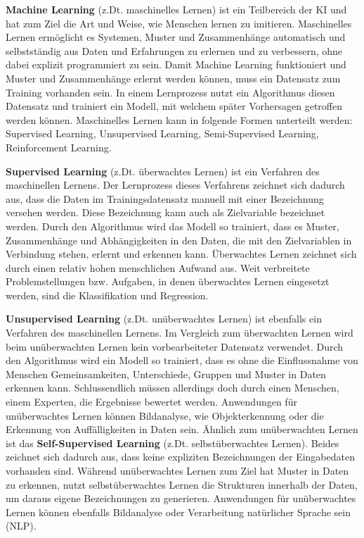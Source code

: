 \textbf{Machine Learning} (z.Dt. maschinelles Lernen) ist ein Teilbereich der KI und hat zum Ziel die Art und Weise, wie Menschen lernen zu imitieren.
Maschinelles Lernen ermöglicht es Systemen, Muster und Zusammenhänge automatisch und selbstständig aus Daten und Erfahrungen zu erlernen und zu verbessern, ohne dabei explizit programmiert zu sein.
Damit Machine Learning funktioniert und Muster und Zusammenhänge erlernt werden können, muss ein Datensatz zum Training vorhanden sein.
In einem Lernprozess nutzt ein Algorithmus diesen Datensatz und trainiert ein Modell, mit welchem später Vorhersagen getroffen werden können.
Maschinelles Lernen kann in folgende Formen unterteilt werden: Supervised Learning, Unsupervised Learning, Semi-Supervised Learning, Reinforcement Learning.

\textbf{Supervised Learning} (z.Dt. überwachtes Lernen) ist ein Verfahren des maschinellen Lernens.
Der Lernprozess dieses Verfahrens zeichnet sich dadurch aus, dass die Daten im Trainingsdatensatz manuell mit einer Bezeichnung versehen werden.
Diese Bezeichnung kann auch als Zielvariable bezeichnet werden.
Durch den Algorithmus wird das Modell so trainiert, dass es Muster, Zusammenhänge und Abhängigkeiten in den Daten, die mit den Zielvariablen in Verbindung stehen, erlernt und erkennen kann.
Überwachtes Lernen zeichnet sich durch einen relativ hohen menschlichen Aufwand aus.
Weit verbreitete Problemstellungen bzw. Aufgaben, in denen überwachtes Lernen eingesetzt werden, sind die Klassifikation und Regression.

\textbf{Unsupervised Learning} (z.Dt. unüberwachtes Lernen) ist ebenfalls ein Verfahren des maschinellen Lernens.
Im Vergleich zum überwachten Lernen wird beim unüberwachten Lernen kein vorbearbeiteter Datensatz verwendet.
Durch den Algorithmus wird ein Modell so trainiert, dass es ohne die Einflussnahme von Menschen Gemeinsamkeiten, Unterschiede, Gruppen und Muster in Daten erkennen kann.
Schlussendlich müssen allerdings doch durch einen Menschen, einem Experten, die Ergebnisse bewertet werden.
Anwendungen für unüberwachtes Lernen können Bildanalyse, wie Objekterkennung oder die Erkennung von Auffälligkeiten in Daten sein.
Ähnlich zum unüberwachten Lernen ist das \textbf{Self-Supervised Learning} (z.Dt. selbstüberwachtes Lernen).
Beides zeichnet sich dadurch aus, dass keine expliziten Bezeichnungen der Eingabedaten vorhanden sind.
Während unüberwachtes Lernen zum Ziel hat Muster in Daten zu erkennen, nutzt selbstüberwachtes Lernen die Strukturen innerhalb der Daten, um daraus eigene Bezeichnungen zu generieren. 
Anwendungen für unüberwachtes Lernen können ebenfalls Bildanalyse oder Verarbeitung natürlicher Sprache sein (NLP).

